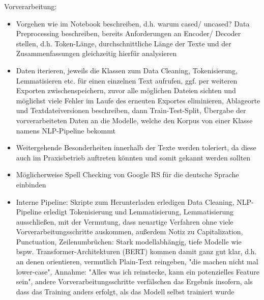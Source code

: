 Vorverarbeitung:
\begin{itemize}
	\item Vorgehen wie im Notebook beschreiben, d.h. warum cased/ uncased? Data Preprocessing beschreiben, bereits Anforderungen an Encoder/ Decoder stellen, d.h. Token-Länge, durchschnittliche Länge der Texte und der Zusammenfassungen gleichzeitig hierfür analysieren
	\item Daten iterieren, jeweils die Klassen zum Data Cleaning, Tokenisierung, Lemmatisieren etc. für einen einzelnen Text aufrufen, ggf. per weiteren Exporten zwischenspeichern, zuvor alle möglichen Dateien sichten und möglichst viele Fehler im Laufe des erneuten Exportes eliminieren, Ablageorte und Textdateiversionen beschreiben, dann Train-Test-Split, Übergabe der vorverarbeiteten Daten an die Modelle, welche den Korpus von einer Klasse namens NLP-Pipeline bekommt
	\item Weitergehende Besonderheiten innerhalb der Texte werden toleriert, da diese auch im Praxisbetrieb auftreten könnten und somit gekannt werden sollten
	\item Möglicherweise Spell Checking von Google RS für die deutsche Sprache einbinden
	\item Interne Pipeline: Skripte zum Herunterladen erledigen Data Cleaning, NLP-Pipeline erledigt Tokenisierung und Lemmatisierung, Lemmatisierung ausschließen, mit der Vermutung, dass neuartige Verfahren ohne viele Vorverarbeitungsschritte auskommen, außerdem Notiz zu Capitalization, Punctuation, Zeilenumbrüchen: Stark modellabhängig, tiefe Modelle wie bspw. Transformer-Architekturen (BERT) kommen damit ganz gut klar, d.h. an denen orientieren, vermutlich Plain-Text reingeben, "die machen nicht mal lower-case", Annahme: "Alles was ich reinstecke, kann ein potenzielles Feature sein", andere Vorverarbeitungsschritte verfälschen das Ergebnis insofern, als dass das Training anders erfolgt, als das Modell selbst trainiert wurde
\end{itemize}

